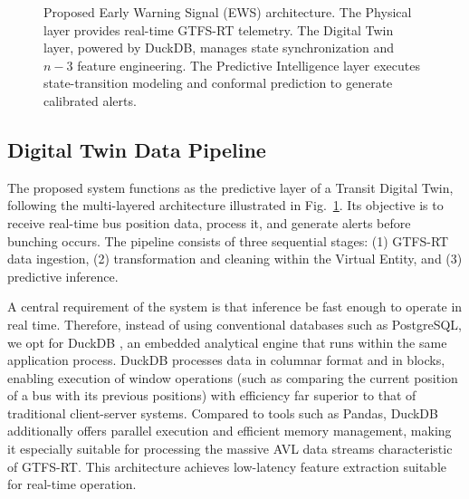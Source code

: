 \documentclass[fleqn,10pt,lineno]{wlpeerj}
\begin{document}
\begin{figure}[htbp]
{
  }
  \caption{Proposed Early Warning Signal (EWS) architecture. The Physical layer provides real-time GTFS-RT telemetry. The Digital Twin layer, powered by DuckDB, manages state synchronization and $n{-}3$ feature engineering. The Predictive Intelligence layer executes state-transition modeling and conformal prediction to generate calibrated alerts.}
  \label{fig:architecture}
\end{figure}

\subsection{Digital Twin Data Pipeline}

The proposed system functions as the predictive layer of a Transit Digital Twin, following the multi-layered architecture illustrated in Fig.~\ref{fig:architecture}. Its objective
is to receive real-time bus position data, process it, and generate alerts before bunching
occurs. The pipeline consists of three sequential stages: (1) GTFS-RT data ingestion,
(2) transformation and cleaning within the Virtual Entity, and (3) predictive inference.

A central requirement of the system is that inference be fast enough to operate in real time.
Therefore, instead of using conventional databases such as PostgreSQL, we opt for DuckDB
\citep{14}, an embedded analytical engine that runs within the same application process. DuckDB
processes data in columnar format and in blocks, enabling execution of window operations (such
as comparing the current position of a bus with its previous positions) with efficiency far
superior to that of traditional client-server systems. Compared to tools such as Pandas, DuckDB
additionally offers parallel execution and efficient memory management, making it especially
suitable for processing the massive AVL data streams characteristic of GTFS-RT. This
architecture achieves low-latency feature extraction suitable for real-time operation.
\end{document}
